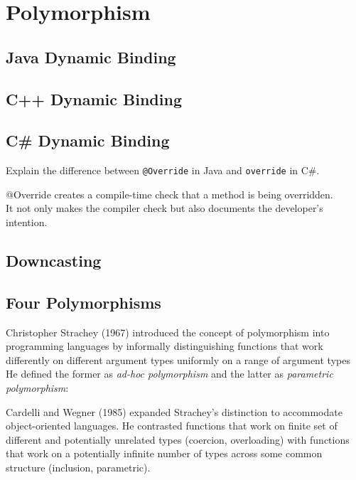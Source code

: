 
\chapter{Polymorphism}





\section{Java Dynamic Binding}


\section{C++ Dynamic Binding}


\section{C\# Dynamic Binding}


\begin{example}
Explain the difference between \lstinline{@Override} in Java and 
\lstinline{override} in C\#.

@Override creates a compile-time check that a method is being overridden.\\
It not only makes the compiler check but also documents the developer's intention.

\end{example} 




\section{Downcasting}




\section{Four Polymorphisms}

Christopher Strachey (1967) introduced the concept of polymorphism into programming languages 
by informally distinguishing functions that work differently on different argument types
uniformly on a range of argument types He defined the former as \textit{ad-hoc polymorphism}
and the latter as \textit{parametric polymorphism}:

Cardelli and Wegner (1985) expanded Strachey's distinction to accommodate object-oriented languages.  
He contrasted functions that work on finite set of different and potentially unrelated types
(coercion, overloading) with functions that work on a potentially infinite number of
types across some common structure (inclusion, parametric). 


